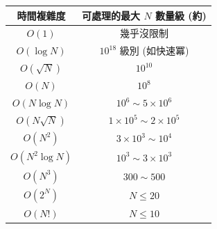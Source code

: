 \begin{center}
\begin{tabular}{|c|c|}
\hline
\textbf{時間複雜度} & \textbf{可處理的最大 $N$ 數量級 (約)} \\
\hline
$O(1)$ & 幾乎沒限制 \\
$O(\log N)$ & $10^{18}$ 級別 (如快速冪) \\
$O(\sqrt{N})$ & $10^{10}$ \\
$O(N)$ & $10^{8}$ \\
$O(N \log N)$ & $10^{6} \sim 5 \times 10^{6}$ \\
$O(N \sqrt{N})$ & $1 \times 10^{5} \sim 2 \times 10^{5}$ \\
$O(N^2)$ & $3 \times 10^{3} \sim 10^{4}$ \\
$O(N^2 \log N)$ & $10^{3} \sim 3 \times 10^{3}$ \\
$O(N^3)$ & $300 \sim 500$ \\
$O(2^N)$ & $N \leq 20$ \\
$O(N!)$ & $N \leq 10$ \\
\hline
\end{tabular}
\end{center}
